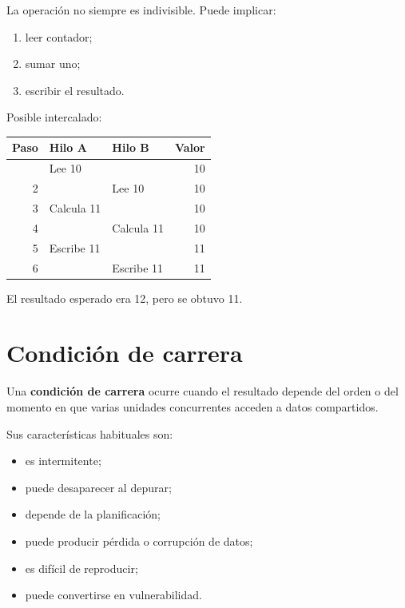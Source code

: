 \documentclass[
  spanish,
  letterpaper,
]{scrbook}
\newcounter{none} %
\providecommand{\tightlist}{%
  \setlength{\itemsep}{0pt}\setlength{\parskip}{0pt}}
\begin{document}
La operación no siempre es indivisible. Puede implicar:

\begin{enumerate}
\def\labelenumi{\arabic{enumi}.}
\tightlist
\item
  leer contador;
\item
  sumar uno;
\item
  escribir el resultado.
\end{enumerate}

Posible intercalado:

{\def\LTcaptype{none} %
\begin{longtable}[]{@{}rllr@{}}
\toprule\noalign{}
Paso & Hilo A & Hilo B & Valor \\
\midrule\noalign{}
\endhead
\bottomrule\noalign{}
\endlastfoot
1 & Lee 10 & & 10 \\
2 & & Lee 10 & 10 \\
3 & Calcula 11 & & 10 \\
4 & & Calcula 11 & 10 \\
5 & Escribe 11 & & 11 \\
6 & & Escribe 11 & 11 \\
\end{longtable}
}

El resultado esperado era 12, pero se obtuvo 11.


\chapter{Condición de carrera}\label{condiciuxf3n-de-carrera}

Una \textbf{condición de carrera} ocurre cuando el resultado depende del
orden o del momento en que varias unidades concurrentes acceden a datos
compartidos.

Sus características habituales son:

\begin{itemize}
\tightlist
\item
  es intermitente;
\item
  puede desaparecer al depurar;
\item
  depende de la planificación;
\item
  puede producir pérdida o corrupción de datos;
\item
  es difícil de reproducir;
\item
  puede convertirse en vulnerabilidad.
\end{itemize}
\end{document}
